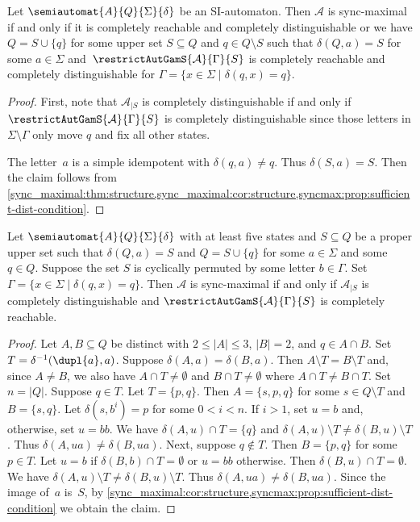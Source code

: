 \begin{corollary}
	Let $\semiautomat{A}{Q}{\Sigma}{\delta}$
	be an SI-automaton.
	Then $\mathcal A$ is sync-maximal if and only if
	it is completely reachable and completely distinguishable
	or we have $Q = S \cup \{q\}$ for some upper set $S \subseteq Q$
	and $q \in Q \setminus S$ such that
	$\delta(Q, a) = S$ for some $a \in \Sigma$
	and~$\restrictAutGamS{\mathcal A}{\Gamma}{S}$ is completely reachable and completely
	distinguishable for $\Gamma = \{ x \in \Sigma \mid \delta(q, x) = q \}$.
\end{corollary}
\begin{proof}
	First, note that $\mathcal A_{|S}$
	is completely distinguishable
	if and only if $\restrictAutGamS{\mathcal A}{\Gamma}{S}$ is completely
	distinguishable since those letters in $\Sigma \setminus \Gamma$
	only move $q$ and fix all other states.	
	
	The letter~$a$ is a simple idempotent with $\delta(q, a) \ne q$.
	Thus $\delta(S, a) = S$.
	Then the claim follows 
	from \cref{sync_maximal:thm:structure,sync_maximal:cor:structure,syncmax:prop:sufficient-dist-condition}.
\end{proof}

\begin{corollary}
	Let $\semiautomat{A}{Q}{\Sigma}{\delta}$ with at least five states and $S \subseteq Q$
	be a proper upper set such that $\delta(Q, a) = S$ and $Q = S \cup \{q\}$ for 
	some $a \in \Sigma$ and some $q \in Q$.
	Suppose the set $S$ is cyclically permuted by some letter $b \in \Gamma$.
	Set $\Gamma = \{ x \in \Sigma \mid \delta(q, x) = q \}$.
	Then $\mathcal A$ is sync-maximal if and only if 
	$\mathcal A_{|S}$ is completely distinguishable
	and $\restrictAutGamS{\mathcal A}{\Gamma}{S}$ is completely reachable.
\end{corollary}
\begin{proof}
	Let $A, B \subseteq Q$ be distinct
	with $2 \le |A| \le 3$, $|B| = 2$,
	and $q \in A \cap B$.
	Set $T = \delta^{-1}(\dupl{a}, a)$.
	Suppose $\delta(A, a) = \delta(B, a)$.
	Then $A \setminus T = B \setminus T$
	and, since $A \ne B$, 
	we also have $A \cap T \ne \emptyset$ and $B \cap T \ne \emptyset$
	where $A \cap T \ne B \cap T$.		
	Set $n = |Q|$.
	Suppose $q \in T$. Let $T = \{p, q\}$.
	Then $A = \{s, p, q\}$ for some $s \in Q \setminus T$
	and $B = \{s, q\}$.
	Let $\delta(s, b^i) = p$ for some $0 < i < n$.
	If $i > 1$, set $u = b$
	and, otherwise, set $u = bb$.
	We have $\delta(A, u) \cap T = \{q\}$
	and $\delta(A, u) \setminus T \ne \delta(B, u) \setminus T$.
	Thus $\delta(A, ua) \ne \delta(B, ua)$.	
	Next, suppose $q \notin T$.
	Then $B = \{p, q\}$ for some $p \in T$.
	Let $u = b$ if $\delta(B, b) \cap T = \emptyset$
	or $u = bb$ otherwise. 
	Then $\delta(B, u) \cap T = \emptyset$.
	We have $\delta(A, u) \setminus T \ne \delta(B, u) \setminus T$.
	Thus $\delta(A, ua) \ne \delta(B, ua)$.	
	Since the image of~$a$ is~$S$,
	by \cref{sync_maximal:cor:structure,syncmax:prop:sufficient-dist-condition}
	we obtain the claim.
\end{proof}

